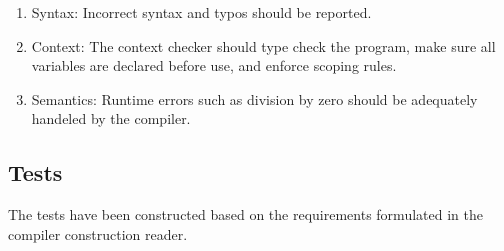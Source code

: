 \documentclass[paper=a4, fontsize=11pt]{article}
\numberwithin{equation}{section}		%
\numberwithin{figure}{section}			%
\numberwithin{table}{section}				%
\begin{document}
\begin{enumerate}
\item Syntax: Incorrect syntax and typos should be reported.
\item Context: The context checker should type check the program, make sure all variables are declared before use, and enforce scoping rules.
\item Semantics: Runtime errors such as division by zero should be adequately handeled by the compiler.
\end{enumerate}

\subsection{Tests}
The tests have been constructed based on the requirements formulated in the compiler construction reader.
\end{document}
